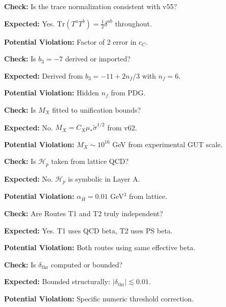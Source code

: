 \documentclass[11pt,a4paper]{article}
\theoremstyle{definition}
\begin{document}
\begin{trapbox}
\textbf{Check:} Is the trace normalization consistent with v55?

\textbf{Expected:} Yes. $\text{Tr}(T^a T^b) = \frac{1}{2}\delta^{ab}$ throughout.

\textbf{Potential Violation:} Factor of 2 error in $c_C$.
\end{trapbox}

\begin{trapbox}
\textbf{Check:} Is $b_3 = -7$ derived or imported?

\textbf{Expected:} Derived from $b_3 = -11 + 2n_f/3$ with $n_f = 6$.

\textbf{Potential Violation:} Hidden $n_f$ from PDG.
\end{trapbox}

\begin{trapbox}
\textbf{Check:} Is $M_X$ fitted to unification bounds?

\textbf{Expected:} No. $M_X = C_X \mu_* \tilde{\sigma}^{1/2}$ from v62.

\textbf{Potential Violation:} $M_X \sim 10^{16}$ GeV from experimental GUT scale.
\end{trapbox}

\begin{trapbox}
\textbf{Check:} Is $\mathcal{H}_p$ taken from lattice QCD?

\textbf{Expected:} No. $\mathcal{H}_p$ is symbolic in Layer A.

\textbf{Potential Violation:} $\alpha_H = 0.01$ GeV$^3$ from lattice.
\end{trapbox}

\begin{trapbox}
\textbf{Check:} Are Routes T1 and T2 truly independent?

\textbf{Expected:} Yes. T1 uses QCD beta, T2 uses PS beta.

\textbf{Potential Violation:} Both routes using same effective beta.
\end{trapbox}

\begin{trapbox}
\textbf{Check:} Is $\delta_{\text{thr}}$ computed or bounded?

\textbf{Expected:} Bounded structurally: $|\delta_{\text{thr}}| \lesssim 0.01$.

\textbf{Potential Violation:} Specific numeric threshold correction.
\end{trapbox}
\end{document}
